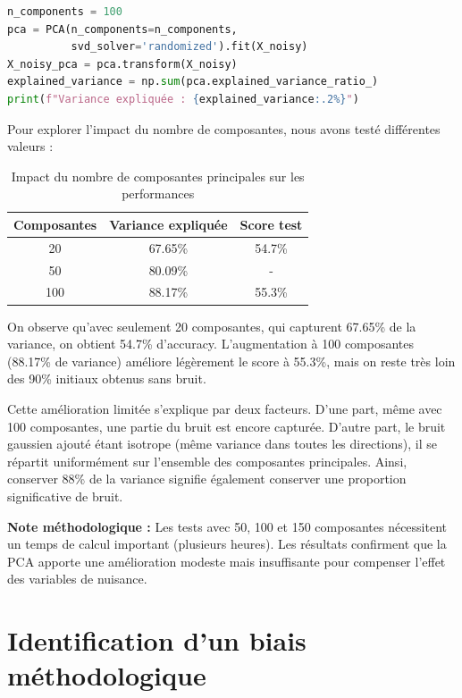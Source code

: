\documentclass[11pt,a4paper]{article}
\begin{document}
\begin{lstlisting}[language=Python, caption=Application de la PCA]
n_components = 100
pca = PCA(n_components=n_components, 
          svd_solver='randomized').fit(X_noisy)
X_noisy_pca = pca.transform(X_noisy)
explained_variance = np.sum(pca.explained_variance_ratio_)
print(f"Variance expliquée : {explained_variance:.2%}")
\end{lstlisting}

Pour explorer l'impact du nombre de composantes, nous avons testé différentes valeurs :

\begin{table}[H]
\centering
\begin{tabular}{|c|c|c|}
\hline
\textbf{Composantes} & \textbf{Variance expliquée} & \textbf{Score test} \\
\hline
20 & 67.65\% & 54.7\% \\
\hline
50 & 80.09\% & - \\
\hline
100 & 88.17\% & 55.3\% \\
\hline
\end{tabular}
\caption{Impact du nombre de composantes principales sur les performances}
\end{table}

On observe qu'avec seulement 20 composantes, qui capturent 67.65\% de la variance, on obtient 54.7\% d'accuracy. L'augmentation à 100 composantes (88.17\% de variance) améliore légèrement le score à 55.3\%, mais on reste très loin des 90\% initiaux obtenus sans bruit.

Cette amélioration limitée s'explique par deux facteurs. D'une part, même avec 100 composantes, une partie du bruit est encore capturée. D'autre part, le bruit gaussien ajouté étant isotrope (même variance dans toutes les directions), il se répartit uniformément sur l'ensemble des composantes principales. Ainsi, conserver 88\% de la variance signifie également conserver une proportion significative de bruit.

\textbf{Note méthodologique :} Les tests avec 50, 100 et 150 composantes nécessitent un temps de calcul important (plusieurs heures). Les résultats confirment que la PCA apporte une amélioration modeste mais insuffisante pour compenser l'effet des variables de nuisance.


\section{Identification d'un biais méthodologique}
\end{document}
